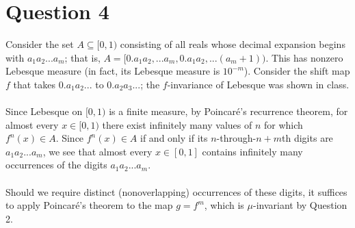 \documentclass[10pt,a4paper]{article}
\begin{document}
\section*{Question 4}
Consider the set $A\subseteq [0,1)$ consisting of all reals whose decimal expansion begins with $a_1a_2...a_m$; that is, $A=[0.a_1a_2,...a_m,0.a_1a_2,...(a_m+1))$. This has nonzero Lebesque measure (in fact, its Lebesque measure is $10^{-m}$). Consider the shift map $f$ that takes $0.a_1a_2...$ to $0.a_2a_3...$; the $f$-invariance of Lebesque was shown in class.\\\\
Since Lebesque on $[0,1)$ is a finite measure, by Poincar\'e's recurrence theorem, for almost every $x\in[0,1)$ there exist infinitely many values of $n$ for which $f^n(x)\in A$. Since $f^n(x)\in A$ if and only if its $n$-through-$n+m$th digits are $a_1a_2...a_m$, we see that almost every $x\in[0,1]$ contains infinitely many occurrences of the digits $a_1a_2...a_m$.\\\\
Should we require distinct (nonoverlapping) occurrences of these digits, it suffices to apply Poincar\'e's theorem to the map $g=f^m$, which is $\mu$-invariant by Question 2.
\end{document}
